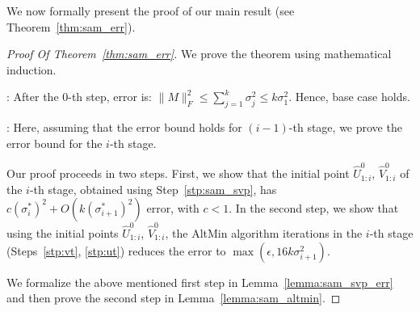 \documentclass[11pt]{article}
\renewcommand{\eqref}[1]{\hyperref[#1]{(\ref*{#1})}}
\theoremstyle{plain}
\newtheorem{theorem}{Theorem}[section]
\theoremstyle{definition}
\newcommand{\rmn}{\mathbb{R}^{m \times n}}
\newcommand{\calA}{\mathcal{A}}
\newcommand{\aff}{{\mathcal A}}
\newcommand{\so}{\sigma^*}
\newcommand{\Vw}{\widehat{V}}
\newcommand{\Uw}{\widehat{U}}
\begin{document}
We now formally present the proof of our main result (see Theorem~\ref{thm:sam_err}). 
\begin{proof}[Proof Of Theorem~\ref{thm:sam_err}]
We prove the theorem using mathematical induction. 

: After the $0$-th step, error is: $\|M\|_F^2\leq \sum_{j=1}^k \sigma_j^2\leq k\sigma_1^2$. Hence, base case holds. 

: Here, assuming that the error bound holds for $(i-1)$-th stage, we prove the error bound for the $i$-th stage. 

Our proof proceeds in two steps. First, we show that the initial point $\Uw^0_{1:i}$, $\Vw^0_{1:i}$ of the $i$-th stage, obtained using Step~\ref{stp:sam_svp}, has $c(\so_{i})^2+O\left(k(\so_{i+1})^2\right)$ error, with $c<1$. In the second step,  we show that using the initial points  $\Uw^0_{1:i}$, $\Vw^0_{1:i}$, the AltMin algorithm iterations in the $i$-th stage (Steps~\ref{stp:vt}, \ref{stp:ut}) reduces the error to $\max(\epsilon,16k\sigma_{i+1}^2)$. 

We formalize the above mentioned first step in Lemma~\ref{lemma:sam_svp_err} and then prove the second step in Lemma~\ref{lemma:sam_altmin}. 
\end{proof}
\end{document}
